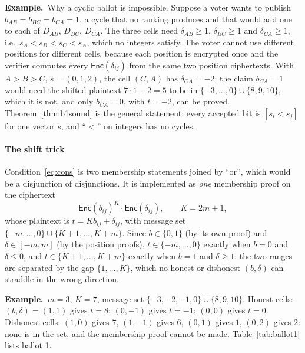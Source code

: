 \documentclass[11pt,a4paper]{article}
\newcommand{\Enc}{\mathsf{Enc}}
\newcommand{\ex}[1]{\par\medskip\noindent\textbf{Example.}~#1\par\medskip}
\theoremstyle{remark}
\begin{document}
\ex{Why a cyclic ballot is impossible. Suppose a voter wants to publish
$b_{AB} = b_{BC} = b_{CA} = 1$, a cycle that no ranking produces and that
would add one to each of $D_{AB}$, $D_{BC}$, $D_{CA}$. The three cells
need $\delta_{AB} \ge 1$, $\delta_{BC} \ge 1$ and $\delta_{CA} \ge 1$,
i.e.\ $s_A < s_B < s_C < s_A$, which no integers satisfy. The voter cannot
use different positions for different cells, because each position is
encrypted once and the verifier computes every $\Enc(\delta_{ij})$ from
the same two position ciphertexts. With $A > B > C$, $s = (0, 1, 2)$, the
cell $(C, A)$ has $\delta_{CA} = -2$: the claim $b_{CA} = 1$ would need
the shifted plaintext $7 \cdot 1 - 2 = 5$ to be in $\{-3, \ldots, 0\}
\cup \{8, 9, 10\}$, which it is not, and only $b_{CA} = 0$, with $t =
-2$, can be proved. Theorem~\ref{thm:b1sound} is the general statement:
every accepted bit is $[s_i < s_j]$ for one vector $s$, and ``$<$'' on
integers has no cycles.}

\paragraph{The shift trick} Condition~\eqref{eq:cons} is two membership
statements joined by ``or'', which would be a disjunction of disjunctions.
It is implemented as \emph{one} membership proof on the ciphertext
\[
  \Enc(b_{ij})^{K} \cdot \Enc(\delta_{ij}), \qquad K = 2m + 1,
\]
whose plaintext is $t = K b_{ij} + \delta_{ij}$, with message set $\{-m,
\ldots, 0\} \cup \{K + 1, \ldots, K + m\}$. Since $b \in \{0, 1\}$ (by its
own proof) and $\delta \in [-m, m]$ (by the position proofs), $t \in \{-m,
\ldots, 0\}$ exactly when $b = 0$ and $\delta \le 0$, and $t \in \{K+1,
\ldots, K+m\}$ exactly when $b = 1$ and $\delta \ge 1$: the two ranges are
separated by the gap $\{1, \ldots, K\}$, which no honest or dishonest $(b,
\delta)$ can straddle in the wrong direction.

\ex{$m = 3$, $K = 7$, message set $\{-3, -2, -1, 0\} \cup \{8, 9, 10\}$.
Honest cells: $(b, \delta) = (1, 1)$ gives $t = 8$; $(0, -1)$ gives $t =
-1$; $(0, 0)$ gives $t = 0$. Dishonest cells: $(1, 0)$ gives $7$, $(1, -1)$
gives $6$, $(0, 1)$ gives $1$, $(0, 2)$ gives $2$: none is in the set, and
the membership proof cannot be made. Table~\ref{tab:ballot1} lists ballot
1.}
\end{document}
